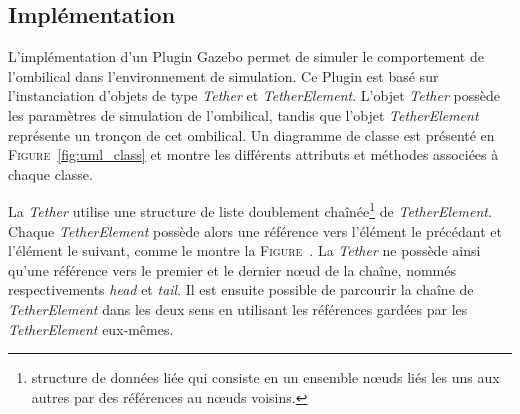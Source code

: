 \subsection{Implémentation}
    L'implémentation d'un \gls{Plugin} \gls{Gazebo} permet de simuler le comportement de l'ombilical dans l'environnement de simulation. Ce \gls{Plugin} est basé sur l'instanciation d'objets de type \textit{Tether} et \textit{TetherElement}. L'objet \textit{Tether} possède les paramètres de simulation de l'ombilical, tandis que l'objet \textit{TetherElement} représente un tronçon de cet ombilical. Un diagramme de classe est présenté en \textsc{Figure}~\ref{fig:uml_class} et montre les différents attributs et méthodes associées à chaque classe.
    
    La \textit{Tether} utilise une structure de liste doublement chaînée\footnote{structure de données liée qui consiste en un ensemble n\oe uds liés les uns aux autres par des références au n\oe uds voisins.} de \textit{TetherElement}. Chaque \textit{TetherElement} possède alors une référence vers l'élément le précédant et l'élément le suivant, comme le montre la \textsc{Figure}~\label{fig:goubly_linked_list}. La \textit{Tether} ne possède ainsi qu'une référence vers le premier et le dernier n\oe ud de la chaîne, nommés respectivements \textit{head} et \textit{tail}. Il est ensuite possible de parcourir la chaîne de \textit{TetherElement} dans les deux sens en utilisant les références gardées par les \textit{TetherElement} eux-mêmes. 

